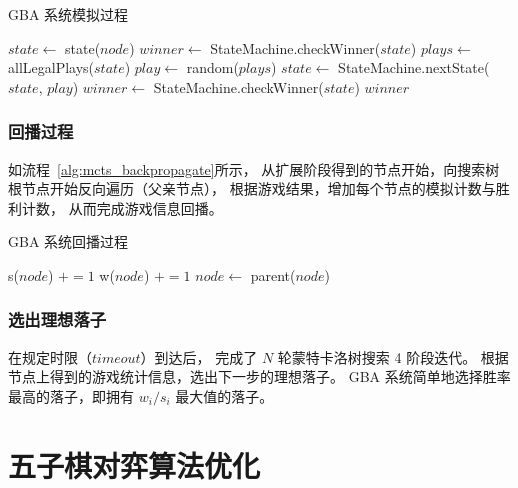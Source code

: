 \documentclass[UTF8,cs4size]{ctexart}
\begin{document}
\begin{algorithm}
	\caption{GBA 系统模拟过程}
	\label{alg:mcts_simulate}
  \begin{algorithmic}[1]
      \State $state \gets$ state($node$)
      \State $winner \gets$ StateMachine.checkWinner($state$)
        \State $plays \gets$ allLegalPlays($state$)
        \State $play \gets$ random($plays$)
        \State $state \gets$ StateMachine.nextState($state$, $play$)
        \State $winner \gets$ StateMachine.checkWinner($state$)
      \EndWhile
      \Return $winner$
    \EndFunction
	\end{algorithmic}  
\end{algorithm}

\subsubsection{回播过程}
如流程~\ref{alg:mcts_backpropagate}所示，
从扩展阶段得到的节点开始，向搜索树根节点开始反向遍历（父亲节点），
根据游戏结果，增加每个节点的模拟计数与胜利计数，
从而完成游戏信息回播。

\begin{algorithm}
	\caption{GBA 系统回播过程}
	\label{alg:mcts_backpropagate}
  \begin{algorithmic}[1]
        \State s($node$) $+= 1$
          \State w($node$) $+= 1$
        \EndIf
        \State $node \gets$ parent($node$)
      \EndWhile
    \EndFunction
	\end{algorithmic}  
\end{algorithm}

\subsubsection{选出理想落子}
在规定时限（$timeout$）到达后，
完成了 $N$ 轮蒙特卡洛树搜索 4 阶段迭代。
根据节点上得到的游戏统计信息，选出下一步的理想落子。
GBA 系统简单地选择胜率最高的落子，即拥有 $w_i/s_i$ 最大值的落子。

\clearpage

\section{五子棋对弈算法优化}
\end{document}
